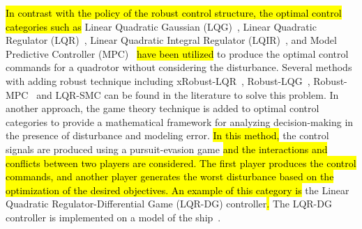 \documentclass[3p]{elsarticle}
\begin{document}
\hl{In contrast with the policy of the robust control structure, the optimal control categories such as }
Linear Quadratic Gaussian (LQG)~\cite{7367782}, Linear Quadratic Regulator (LQR)~\cite{7064553_LQR}, Linear Quadratic Integral Regulator (LQIR)~\cite{article_LQIR}, and Model Predictive Controller (MPC)~\cite{SANTOS2022123, CAMARA20231} \hl{have been utilized}
 to produce the optimal control commands for a quadrotor without considering the disturbance. Several methods with adding robust technique including xRobust-LQR~{\cite{robust_LQR}}, Robust-LQG~{\cite{XU202084}}, Robust-MPC~{\cite{YAN202335}} and LQR-SMC can be found in the literature to solve this problem. In another approach, the game theory technique is added to optimal control categories to provide a mathematical framework for analyzing decision-making in the presence of disturbance and modeling error.
\hl{In this method,} the control signals are produced using a pursuit-evasion game \hl{and the interactions and conflicts between two players are considered. The first player produces the control commands, and another player generates the worst disturbance based on the optimization of the desired objectives. An example of this category is} the Linear Quadratic Regulator-Differential Game (LQR-DG) controller\hl{. }The LQR-DG controller is implemented on a model of the ship~\cite{6957349}.



















































\end{document}
